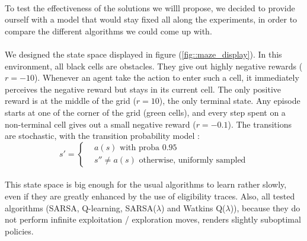 \documentclass[a4paper]{report}
\begin{document}
{{			\paragraph{} To test the effectiveness of the solutions we willl propose, we decided to provide ourself with a model that would stay fixed all along the experiments, in order to compare the different algorithms we could come up with. 
			
			\paragraph{} We designed the state space displayed in figure (\ref{fig::maze_display}). In this environment, all black cells are obstacles. They give out highly negative rewards ($r=-10$). Whenever an agent take the action to enter such a cell, it immediately perceives the negative reward but stays in its current cell. The only positive reward is at the middle of the grid ($r=10$), the only terminal state. Any episode starts at one of the corner of the grid (green cells), and every step spent on a non-terminal cell gives out a small negative reward ($r=-0.1$). The transitions are stochastic, with the transition probability model : 
			\begin{equation}
				s' = \left\{ 
					\begin{aligned}
						&a(s) \text{ with proba } 0.95 \\
						&s'' \neq a(s) \text{ otherwise, uniformly sampled}
					\end{aligned}\right.
			\end{equation}
			 
			 \paragraph{} This state space is big enough for the usual algorithms to learn rather slowly, even if they are greatly enhanced by the use of eligibility traces. Also, all tested algorithms (SARSA, Q-learning, SARSA($\lambda$) and Watkins Q($\lambda$)), because they do not perform infinite exploitation / exploration moves, renders slightly suboptimal policies. 
			
}}
\end{document}

